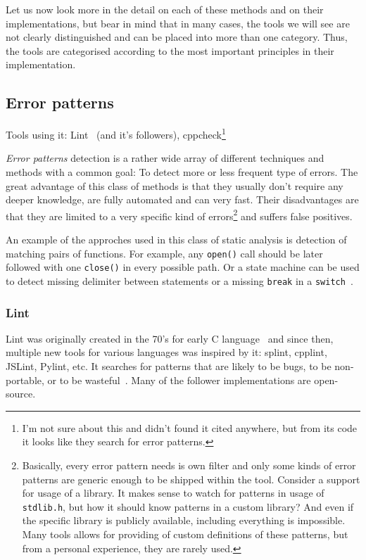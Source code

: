 Let us now look more in the detail on each of these methods and on their implementations, but bear in mind that in many cases, the tools we will see are not clearly distinguished and can be placed into more than one category. Thus, the tools are categorised according to the most important principles in their implementation.

\subsection{Error patterns}
Tools using it: Lint~\cite{KrenaVojnarOverview} (and it's followers), cppcheck\footnote{I'm not sure about this and didn't found it cited anywhere, but from its code it looks like they search for error patterns.}

{\em Error patterns} detection is a rather wide array of different techniques and methods with a common goal: To detect more or less frequent type of errors. The great advantage of this class of methods is that they usually don't require any deeper knowledge, are fully automated and can very fast. Their disadvantages are that they are limited to a very specific kind of errors\footnote{Basically, every error pattern needs is own filter and only some kinds of error patterns are generic enough to be shipped within the tool. Consider a support for usage of a library. It makes sense to watch for patterns in usage of {\tt stdlib.h}, but how it should know patterns in a custom library? And even if the specific library is publicly available, including everything is impossible. Many tools allows for providing of custom definitions of these patterns, but from a personal experience, they are rarely used.} and suffers false positives.

An example of the approches used in this class of static analysis is detection of matching pairs of functions. For example, any {\tt open()} call should be later followed with one {\tt close()} in every possible path. Or a state machine can be used to detect missing delimiter between statements or a missing {\tt break} in a {\tt switch}~\cite{dynamine}.

\subsubsection{Lint}
Lint was originally created in the 70's for early C language~\cite[Chap. 2.2]{KrenaVojnarOverview} and since then, multiple new tools for various languages was inspired by it: splint, cpplint, JSLint, Pylint, etc. It searches for patterns that are likely to be bugs, to be non-portable, or to be wasteful~\cite{lintMan}. Many of the follower implementations are open-source.

